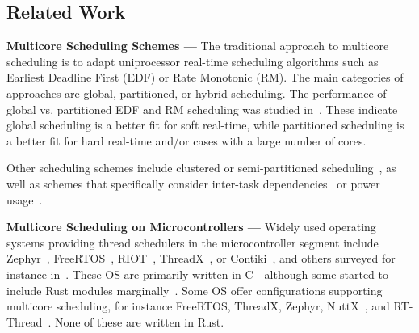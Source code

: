 \subsection{Related Work}
\label{sec:related-work}



\textbf{Multicore Scheduling Schemes ---} The traditional approach to multicore scheduling is to adapt uniprocessor real-time scheduling algorithms such as Earliest Deadline First (EDF) or Rate Monotonic (RM).
The main categories of approaches are global, partitioned, or hybrid scheduling. The performance of global vs. partitioned EDF and RM scheduling was studied in~\cite{P-PF-partition-or-not, hardrealtime-multiprocessor-survey, GRMS, EDF-RM-multiprocessor-survey}. These indicate global scheduling is a better fit for soft real-time, while partitioned scheduling is a better fit for hard real-time and/or cases with a large number of cores.
\iffalse
Their findings are that global scheduling is generally more favorable for soft real-time systems because it can balance out individual deadline misses. 
Partitioned scheduling, on the other hand, is more suited for hard real-time systems because deadline misses on one core won’t affect any of the other cores. 
Furthermore, they showed that partitioned schemes scale better for a large processor count.
\fi
Other scheduling schemes include clustered or semi-partitioned scheduling~\cite{brandenburg, hardrealtime-multiprocessor-survey, energy-efficient-sched-for-HRT}, as well as schemes that specifically consider inter-task dependencies~\cite{allocate-dags-to-multiprocessors, shared-resources-coolocation, scheduling-task-on-heterogenous-multicore, mapping-in-multicore, resource-oriented-partitioned-scheduling} or power usage~\cite{scheduling-for-low-power-platforms}.

\textbf{Multicore Scheduling on Microcontrollers ---} Widely used operating systems providing thread schedulers in the microcontroller segment include Zephyr~\cite{zephyr}, FreeRTOS~\cite{freertos}, RIOT~\cite{baccelli2018riot}, ThreadX~\cite{threadx}, or Contiki~\cite{dunkels2004contiki}, and others surveyed for instance in~\cite{hahm2015operating}. These OS are primarily written in C---although some started to include Rust modules marginally~\cite{riot-wrappers}.
Some OS offer configurations supporting multicore scheduling, 
for instance FreeRTOS, ThreadX, Zephyr, NuttX~\cite{nuttx}, and RT-Thread~\cite{rt-thread}. None of these are written in Rust.


